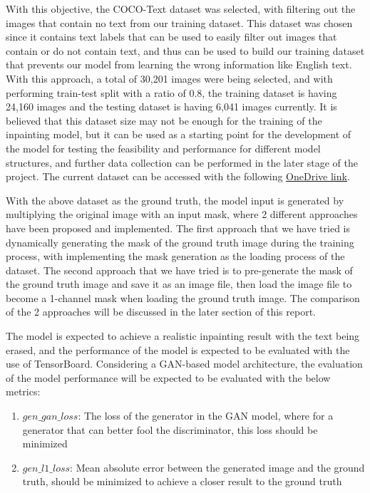 \documentclass[10pt,twocolumn,letterpaper]{article}
\begin{document}
With this objective, the COCO-Text dataset was selected, with filtering out the images that contain no text from our training dataset. This dataset was 
chosen since it contains text labels that can be used to easily filter out images that contain or do not contain text, and thus can be used to build our training 
dataset that prevents our model from learning the wrong information like English text. With this approach, a total of 30,201 images were being selected, and with 
performing train-test split with a ratio of 0.8, the training dataset is having 24,160 images and the testing dataset is having 6,041 images currently. It is believed
that this dataset size may not be enough for the training of the inpainting model, but it can be used as a starting point for the development of the model for testing
the feasibility and performance for different model structures, and further data collection can be performed in the later stage of the project. The current dataset can
be accessed with the following 
\href{https://hkustconnect-my.sharepoint.com/:u:/g/personal/tkleungal_connect_ust_hk/EUJ-38d8cptNgW2RK0JzHI4BfIi5mXwbIEFObTG7ji9f8g?e=LqJ1Eu}{OneDrive link}.

With the above dataset as the ground truth, the model input is generated by multiplying the original image with an input mask, where 2 different approaches have been 
proposed and implemented. The first approach that we have tried is dynamically generating the mask of the ground truth image during the training process, with implementing
the mask generation as the loading process of the dataset. The second approach that we have tried is to pre-generate the mask of the ground truth image and save it as an image
file, then load the image file to become a 1-channel mask when loading the ground truth image. The comparison of the 2 approaches will be discussed in the later 
section of this report.

The model is expected to achieve a realistic inpainting result with the text being erased, and the performance of the model is expected to be evaluated with the
use of TensorBoard. Considering a GAN-based model architecture, the evaluation of the model performance will be expected to be evaluated with the below metrics:
\begin{enumerate}
    \item $gen\_gan\_loss$: The loss of the generator in the GAN model, where for a generator that can better fool the discriminator, this loss should be minimized
    \item $gen\_l1\_loss$: Mean absolute error between the generated image and the ground truth, should be minimized to achieve a closer result to the ground truth
\end{enumerate}
\end{document}
